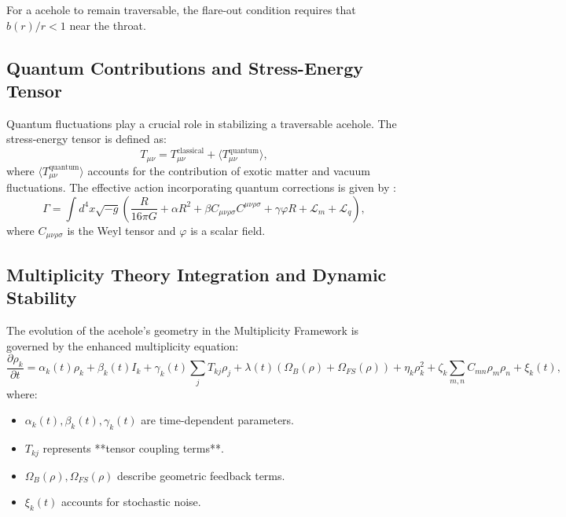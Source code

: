 \documentclass{article}
\theoremstyle{plain}
\begin{document}
\begin{itemize}
\begin{itemize}
For a acehole to remain traversable, the flare-out condition requires that $b(r)/r < 1$ near the throat.

\subsection{Quantum Contributions and Stress-Energy Tensor}

Quantum fluctuations play a crucial role in stabilizing a traversable acehole. The stress-energy tensor is defined as:
\begin{equation}
T_{\mu\nu} = T_{\mu\nu}^{\text{classical}} + \langle T_{\mu\nu}^{\text{quantum}} \rangle,
\end{equation}
where $\langle T_{\mu\nu}^{\text{quantum}} \rangle$ accounts for the contribution of exotic matter and vacuum fluctuations. The effective action incorporating quantum corrections is given by \cite{hawking1975radiation}:
\begin{equation}
\Gamma = \int d^4x \sqrt{-g} \left( \frac{R}{16\pi G} + \alpha R^2 + \beta C_{\mu\nu\rho\sigma} C^{\mu\nu\rho\sigma} + \gamma \varphi R + \mathcal{L}_m + \mathcal{L}_q \right),
\end{equation}
where $C_{\mu\nu\rho\sigma}$ is the Weyl tensor and $\varphi$ is a scalar field.

\subsection{Multiplicity Theory Integration and Dynamic Stability}

The evolution of the acehole’s geometry in the Multiplicity Framework is governed by the enhanced multiplicity equation:
\begin{equation}
\frac{\partial \rho_k}{\partial t} = \alpha_k(t) \rho_k + \beta_k(t) I_k + \gamma_k(t) \sum_j T_{kj} \rho_j + \lambda(t) (\Omega_B(\rho) + \Omega_{FS}(\rho)) + \eta_k \rho_k^2 + \zeta_k \sum_{m,n} C_{mn} \rho_m \rho_n + \xi_k(t),
\end{equation}
where:
\begin{itemize}
    \item $\alpha_k(t), \beta_k(t), \gamma_k(t)$ are time-dependent parameters.
    \item $T_{kj}$ represents **tensor coupling terms**.
    \item $\Omega_B(\rho), \Omega_{FS}(\rho)$ describe geometric feedback terms.
    \item $\xi_k(t)$ accounts for stochastic noise.
\end{itemize}


\end{itemize}
\end{itemize}
\end{document}
